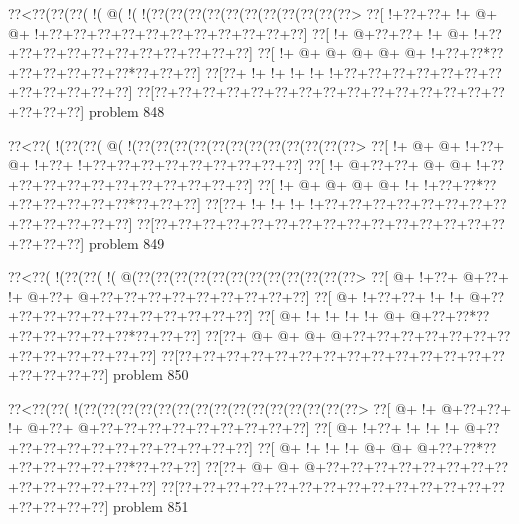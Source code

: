 \vbox{\vbox{\goo
\0??<\0??(\0??(\0??(\- !(\- @(\- !(\- !(\0??(\0??(\0??(\0??(\0??(\0??(\0??(\0??(\0??(\0??(\0??>
\0??[\- !+\0??+\0??+\- !+\- @+\- @+\- !+\0??+\0??+\0??+\0??+\0??+\0??+\0??+\0??+\0??+\0??+\0??]
\0??[\- !+\- @+\0??+\0??+\- !+\- @+\- !+\0??+\0??+\0??+\0??+\0??+\0??+\0??+\0??+\0??+\0??+\0??]
\0??[\- !+\- @+\- @+\- @+\- @+\- @+\- !+\0??+\0??*\0??+\0??+\0??+\0??+\0??+\0??*\0??+\0??+\0??]
\0??[\0??+\- !+\- !+\- !+\- !+\- !+\0??+\0??+\0??+\0??+\0??+\0??+\0??+\0??+\0??+\0??+\0??+\0??]
\0??[\0??+\0??+\0??+\0??+\0??+\0??+\0??+\0??+\0??+\0??+\0??+\0??+\0??+\0??+\0??+\0??+\0??+\0??]
}
\hfil problem 848\hfil\break
}



\vbox{\vbox{\goo
\0??<\0??(\- !(\0??(\0??(\- @(\- !(\0??(\0??(\0??(\0??(\0??(\0??(\0??(\0??(\0??(\0??(\0??(\0??>
\0??[\- !+\- @+\- @+\- !+\0??+\- @+\- !+\0??+\- !+\0??+\0??+\0??+\0??+\0??+\0??+\0??+\0??+\0??]
\0??[\- !+\- @+\0??+\0??+\- @+\- @+\- !+\0??+\0??+\0??+\0??+\0??+\0??+\0??+\0??+\0??+\0??+\0??]
\0??[\- !+\- @+\- @+\- @+\- @+\- !+\- !+\0??+\0??*\0??+\0??+\0??+\0??+\0??+\0??*\0??+\0??+\0??]
\0??[\0??+\- !+\- !+\- !+\- !+\0??+\0??+\0??+\0??+\0??+\0??+\0??+\0??+\0??+\0??+\0??+\0??+\0??]
\0??[\0??+\0??+\0??+\0??+\0??+\0??+\0??+\0??+\0??+\0??+\0??+\0??+\0??+\0??+\0??+\0??+\0??+\0??]
}
\hfil problem 849\hfil\break
}



\vbox{\vbox{\goo
\0??<\0??(\- !(\0??(\0??(\- !(\- @(\0??(\0??(\0??(\0??(\0??(\0??(\0??(\0??(\0??(\0??(\0??(\0??>
\0??[\- @+\- !+\0??+\- @+\0??+\- !+\- @+\0??+\- @+\0??+\0??+\0??+\0??+\0??+\0??+\0??+\0??+\0??]
\0??[\- @+\- !+\0??+\0??+\- !+\- !+\- @+\0??+\0??+\0??+\0??+\0??+\0??+\0??+\0??+\0??+\0??+\0??]
\0??[\- @+\- !+\- !+\- !+\- !+\- @+\- @+\0??+\0??*\0??+\0??+\0??+\0??+\0??+\0??*\0??+\0??+\0??]
\0??[\0??+\- @+\- @+\- @+\- @+\0??+\0??+\0??+\0??+\0??+\0??+\0??+\0??+\0??+\0??+\0??+\0??+\0??]
\0??[\0??+\0??+\0??+\0??+\0??+\0??+\0??+\0??+\0??+\0??+\0??+\0??+\0??+\0??+\0??+\0??+\0??+\0??]
}
\hfil problem 850\hfil\break
}



\vbox{\vbox{\goo
\0??<\0??(\0??(\- !(\0??(\0??(\0??(\0??(\0??(\0??(\0??(\0??(\0??(\0??(\0??(\0??(\0??(\0??(\0??>
\0??[\- @+\- !+\- @+\0??+\0??+\- !+\- @+\0??+\- @+\0??+\0??+\0??+\0??+\0??+\0??+\0??+\0??+\0??]
\0??[\- @+\- !+\0??+\- !+\- !+\- !+\- @+\0??+\0??+\0??+\0??+\0??+\0??+\0??+\0??+\0??+\0??+\0??]
\0??[\- @+\- !+\- !+\- !+\- @+\- @+\- @+\0??+\0??*\0??+\0??+\0??+\0??+\0??+\0??*\0??+\0??+\0??]
\0??[\0??+\- @+\- @+\- @+\0??+\0??+\0??+\0??+\0??+\0??+\0??+\0??+\0??+\0??+\0??+\0??+\0??+\0??]
\0??[\0??+\0??+\0??+\0??+\0??+\0??+\0??+\0??+\0??+\0??+\0??+\0??+\0??+\0??+\0??+\0??+\0??+\0??]
}
\hfil problem 851\hfil\break
}



